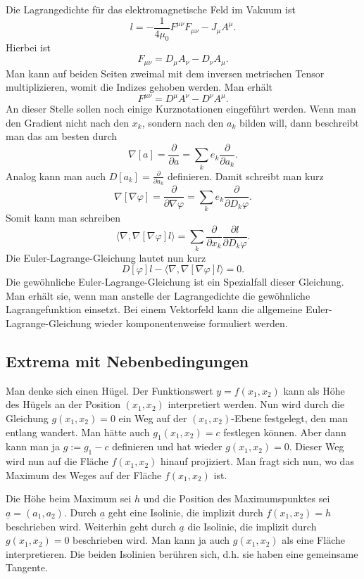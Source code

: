 \documentclass[a4paper,10pt,fleqn,twocolumn,twoside]{article}
\begin{document}
Die Lagrangedichte für das elektromagnetische Feld im Vakuum ist
\[l = -\frac{1}{4\mu_0} F^{\mu\nu}F_{\mu\nu} -J_\mu A^\mu.\]
Hierbei ist
\[F_{\mu\nu} = D_\mu A_\nu - D_\nu A_\mu.\]
Man kann auf beiden Seiten zweimal mit dem inversen metrischen
Tensor multiplizieren, womit die Indizes gehoben werden. Man erhält
\[F^{\mu\nu} = D^\mu A^\nu - D^\nu A^\mu.\]
An dieser Stelle sollen noch einige Kurznotationen eingeführt werden.
Wenn man den Gradient nicht nach den \(x_k\), sondern nach
den \(a_k\) bilden will, dann beschreibt man das am besten durch
\[\nabla[a] = \frac{\partial}{\partial a}
= \sum_k e_k\frac{\partial}{\partial a_k}.\]
Analog kann man auch \(D[a_k]=\frac{\partial}{\partial a_k}\)
definieren.
Damit schreibt man kurz
\[\nabla[\nabla\varphi] = \frac{\partial}{\partial\nabla\varphi}
= \sum_k e_k\frac{\partial}{\partial D_k\varphi}.\]
Somit kann man schreiben
\[\langle\nabla,\nabla[\nabla\varphi]l\rangle
= \sum_k \frac{\partial}{\partial x_k}
\frac{\partial l}{\partial D_k\varphi}.\]
Die Euler-Lagrange-Gleichung lautet nun kurz
\[D[\varphi]l-\langle\nabla,\nabla[\nabla\varphi]l\rangle=0.\]
Die gewöhnliche Euler-Lagrange-Gleichung ist ein Spezialfall dieser
Gleichung. Man erhält sie, wenn man anstelle der Lagrangedichte
die gewöhnliche Lagrangefunktion einsetzt. Bei einem Vektorfeld
kann die allgemeine Euler-Lagrange-Gleichung wieder komponentenweise
formuliert werden.

\subsection{Extrema mit Nebenbedingungen}

Man denke sich einen Hügel. Der Funktionswert \(y=f(x_1,x_2)\) kann
als Höhe des Hügels an der Position \((x_1,x_2)\) interpretiert
werden. Nun wird durch die Gleichung \(g(x_1,x_2)=0\) ein Weg auf der
\((x_1,x_2)\)-Ebene festgelegt, den man entlang wandert.
Man hätte auch \(g_1(x_1,x_2)=c\)
festlegen können. Aber dann kann man ja \(g:=g_1-c\) definieren und
hat wieder \(g(x_1,x_2)=0\). Dieser Weg wird nun auf die Fläche
\(f(x_1,x_2)\) hinauf projiziert. Man fragt sich nun, wo das Maximum
des Weges auf der Fläche \(f(x_1,x_2)\) ist.

Die Höhe beim Maximum sei \(h\) und die Position des Maximumspunktes
sei \(\underline a = (a_1,a_2)\). Durch \(\underline a\) geht eine
Isolinie, die implizit durch \(f(x_1,x_2)=h\) beschrieben wird.
Weiterhin geht durch \(\underline a\) die
Isolinie, die implizit durch \(g(x_1,x_2)=0\) beschrieben wird.
Man kann ja auch \(g(x_1,x_2)\) als eine Fläche interpretieren.
Die beiden Isolinien berühren sich, d.h. sie
haben eine gemeinsame Tangente.
\end{document}
